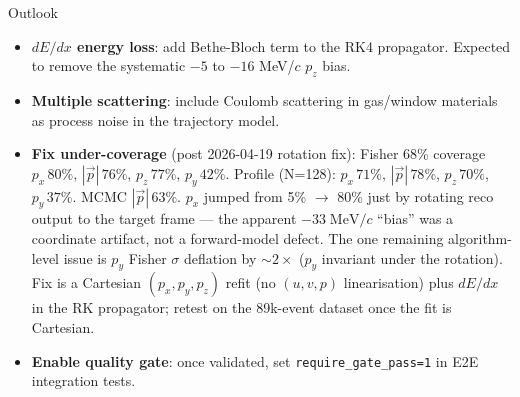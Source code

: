 \documentclass[aspectratio=169]{beamer}
\begin{document}
\begin{frame}{Outlook}
\small
\begin{itemize}
\item \textbf{$dE/dx$ energy loss}: add Bethe-Bloch term to the RK4 propagator. Expected to remove the systematic $-5$ to $-16$ MeV/$c$ $p_z$ bias.

\item \textbf{Multiple scattering}: include Coulomb scattering in gas/window materials as process noise in the trajectory model.

\item \textbf{Fix under-coverage} (post 2026-04-19 rotation fix): Fisher 68\% coverage $p_x\,80\%$, $|\vec p|\,76\%$, $p_z\,77\%$, $p_y\,42\%$. Profile (N=128): $p_x\,71\%$, $|\vec p|\,78\%$, $p_z\,70\%$, $p_y\,37\%$. MCMC $|\vec p|\,63\%$. $p_x$ jumped from 5\% $\to$ 80\% just by rotating reco output to the target frame --- the apparent $-33\;\mathrm{MeV}/c$ ``bias'' was a coordinate artifact, not a forward-model defect. The one remaining algorithm-level issue is $p_y$ Fisher $\sigma$ deflation by $\sim 2\times$ ($p_y$ invariant under the rotation). Fix is a Cartesian $(p_x,p_y,p_z)$ refit (no $(u,v,p)$ linearisation) plus $dE/dx$ in the RK propagator; retest on the 89k-event dataset once the fit is Cartesian.

\item \textbf{Enable quality gate}: once validated, set \texttt{require\_gate\_pass=1} in E2E integration tests.
\end{itemize}
\end{frame}

\end{document}
